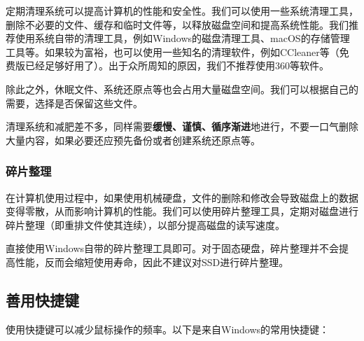 定期清理系统可以提高计算机的性能和安全性。我们可以使用一些系统清理工具，删除不必要的文件、缓存和临时文件等，以释放磁盘空间和提高系统性能。我们推荐使用系统自带的清理工具，例如Windows的磁盘清理工具、macOS的存储管理工具等。如果较为富裕，也可以使用一些知名的清理软件，例如CCleaner等（免费版已经足够好用了）。出于众所周知的原因，我们不推荐使用360等软件。

除此之外，休眠文件、系统还原点等也会占用大量磁盘空间。我们可以根据自己的需要，选择是否保留这些文件。

\begin{caution}
  清理系统和减肥差不多，同样需要\textbf{缓慢、谨慎、循序渐进}地进行，不要一口气删除大量内容，如果必要还应预先备份或者创建系统还原点等。
\end{caution}

\subsubsection{碎片整理}

在计算机使用过程中，如果使用机械硬盘，文件的删除和修改会导致磁盘上的数据变得零散，从而影响计算机的性能。我们可以使用碎片整理工具，定期对磁盘进行碎片整理（即重排文件使其连续），以部分提高磁盘的读写速度。

直接使用Windows自带的碎片整理工具即可。对于固态硬盘，碎片整理并不会提高性能，反而会缩短使用寿命，因此不建议对SSD进行碎片整理。

\subsection{善用快捷键}

使用快捷键可以减少鼠标操作的频率。以下是来自Windows的常用快捷键：

